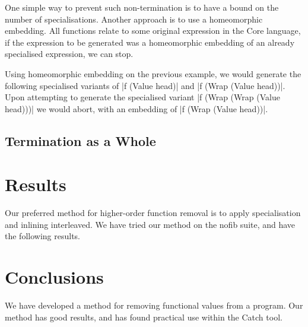 \documentclass[preprint]{sigplanconf}
\begin{document}
One simple way to prevent such non-termination is to have a bound on the number of specialisations. Another approach is to use a homeomorphic embedding. All functions relate to some original expression in the Core language, if the expression to be generated was a homeomorphic embedding of an already specialised expression, we can stop.

Using homeomorphic embedding on the previous example, we would generate the following specialised variants of |f (Value head)| and |f (Wrap (Value head))|. Upon attempting to generate the specialised variant |f (Wrap (Wrap (Value head)))| we would abort, with an embedding of |f (Wrap (Value head))|.

\subsection{Termination as a Whole}






\section{Results}

Our preferred method for higher-order function removal is to apply specialisation and inlining interleaved. We have tried our method on the nofib suite, and have the following results.

\section{Conclusions}

We have developed a method for removing functional values from a program. Our method has good results, and has found practical use within the Catch tool.






\end{document}
